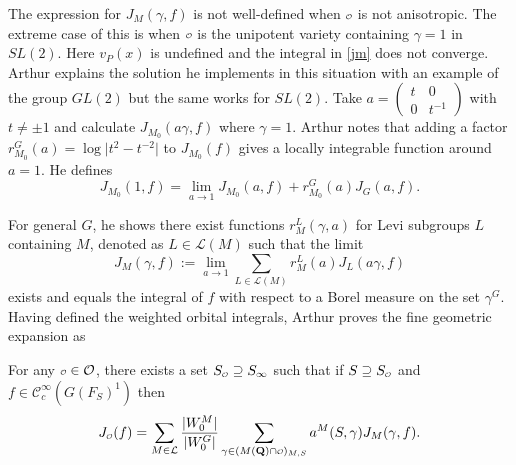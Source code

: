 \documentclass{ims9x6}
\def\Q{\mathbf Q}
\def\CCC{\mathcal C}
\def\LLL{\mathcal L}
\def\O{\mathcal O}
\def\o{\scalebox{0.7}{$\scriptstyle\mathcal{O}$}}
\def\mod#1{\lvert #1 \rvert} %
\begin{document}
The expression for $J_M(\gamma, f)$ is not well-defined when $\o$ is not anisotropic. The extreme case of this is when $\o$ is the unipotent variety containing $\gamma = 1$ in $SL(2)$. Here $v_P(x)$ is undefined and the integral in \cref{jm} does not converge. Arthur explains the solution he implements in this situation with an example of the group $GL(2)$ but the same works for $SL(2)$. Take $a = \begin{pmatrix} t & 0 \\ 0 & t^{-1} \end{pmatrix}$ with $t \neq \pm 1$ and calculate $J_{M_0}(a\gamma, f)$ where $\gamma = 1$. Arthur notes that adding a factor $r_{M_0}^G(a) = \log \mod{t^2 - t^{-2}}$ to $J_{M_0}(f)$ gives a locally integrable function around $a=1$. He defines
\begin{equation} \label{lim_orbint}
	J_{M_0}(1, f) = \lim_{a \to 1} J_{M_0}(a, f) + r_{M_0}^G(a) J_G(a, f).
\end{equation}

For general $G$, he shows \cite[p.~103]{clay} there exist functions $r_M^L(\gamma, a)$ for Levi subgroups $L$ containing $M$, denoted as $L \in \LLL(M)$ such that the limit
\[ J_M(\gamma, f) := \lim_{a \to 1} \sum_{L \in \LLL(M)} r_M^L(a) J_L(a\gamma, f) \]
exists and equals the integral of $f$ with respect to a Borel measure on the set $\gamma^G$. Having defined the weighted orbital integrals, Arthur proves the fine geometric expansion as
\begin{theorem} \cite[Theorem~19.2]{clay}
	For any $\o \in \O$, there exists a set $S_{\o} \supseteq S_\infty$ such that if $S \supseteq S_{\o}$ and $f \in \CCC_c^\infty(G(F_S)^1)$ then
	\[ J_{\o}(f) = \sum_{M \in \LLL} \frac{\mod{W_0^M}}{\mod{W_0^G}} \sum_{\gamma \in (M(\Q)\cap \o)_{M, S}}
			a^M(S, \gamma) J_M(\gamma, f). \]
\end{theorem}
\end{document}
